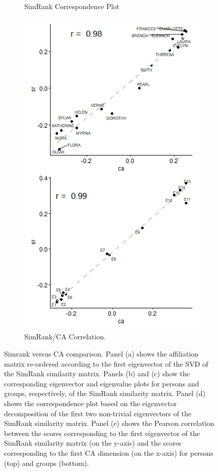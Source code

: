 \documentclass[a4paper,fleqn]{cas-sc}
\begin{document}
\begin{figure}
\begin{subfigure}[b]{0.55\textwidth}
            \caption{SimRank Correspondence Plot}
            \label{fig:g-bon-sim}
    \end{subfigure} 
     \begin{subfigure}[b]{0.3\textwidth}
        \includegraphics[width=1.0\textwidth]{Plots/sr-corr-scatter.png}
            \caption{SimRank/CA Correlation.}
            \label{fig:sr-corr}
    \end{subfigure}
    \caption{Simrank versus CA comparison. Panel (a) shows the affiliation matrix re-ordered according to the first eigenvector of the SVD of the SimRank similarity matrix. Panels (b) and (c) show the corresponding eigenvector and eigenvalue plots for persons and groups, respectively, of the SimRank similarity matrix. Panel (d) shows the correspondence plot based on the eigenvector decomposition of the first two non-trivial eigenvectors of the SimRank similarity matrix. Panel (e) shows the Pearson correlation between the scores corresponding to the first eigenvector of the SimRank similarity matrix (on the y-axis) and the scores corresponding to the first CA dimension (on the x-axis) for persons (top) and groups (bottom).}

\end{figure}
\end{document}

